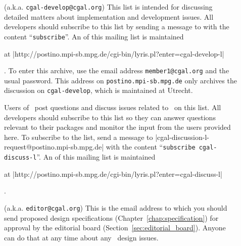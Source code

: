 \begin{description}
\item[] 
     (a.k.a. \texttt{cgal-develop@cgal.org})
     This list is intended for discussing detailed matters 
     about implementation and development issues.  All developers should 
     subscribe to this list by sending a message to
     with the content ``\texttt{subscribe}''. 
     An  
     of this mailing list is maintained%
     \begin{ccTexOnly}
     at \nonlinkedpath|http://postino.mpi-sb.mpg.de/cgi-bin/lyris.pl?enter=cgal-develop-l|
     \end{ccTexOnly}.  To enter this archive, use the email address
     \texttt{member1@cgal.org} and the usual password.  This address on
     \texttt{postino.mpi-sb.mpg.de} only
     archives the discussion on \texttt{cgal-develop}, which is maintained
     at Utrecht.

\item[] 
     Users of \cgal\ post questions and discuss issues
     related to \cgal\ on this list.  All developers should subscribe to this 
     list so they can answer questions relevant to their packages and monitor 
     the input from the users provided here. 
     To subscribe to the list, send a message to
     {\nonlinkedpath|cgal-discussion-l-request@postino.mpi-sb.mpg.de|}
     with the content ``\texttt{subscribe cgal-discuss-l}''.
     An  
     of this mailing list is maintained%
     \begin{ccTexOnly}
     at \nonlinkedpath|http://postino.mpi-sb.mpg.de/cgi-bin/lyris.pl?enter=cgal-discuss-l|
     \end{ccTexOnly}.

\item[] 
     (a.k.a. \texttt{editor@cgal.org})
     This is the email address to which you should
     send proposed design specifications (Chapter~\ref{chap:specification})
     for approval by the editorial 
     board (Section~\ref{sec:editorial_board}). Anyone can do that 
     at any time about any \cgal\ design issues. 


\end{description}
